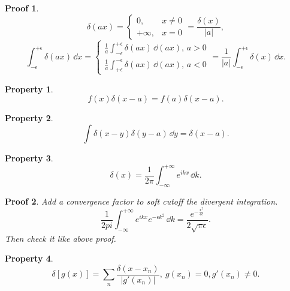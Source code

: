 \documentclass{article}
\theoremstyle{1}
\newtheorem{property}{Property}
\theoremstyle{2}
\newtheorem*{proof_env}{Proof}
\begin{document}
\begin{proof_env}
    \begin{equation}
        \delta(ax)=\left\{\begin{matrix}
           0,&x\not=0\\
            +\infty,&x=0 
        \end{matrix}\right. =\frac{\delta(x)}{\left|a\right|},
    \end{equation}
    \begin{equation}
       \int_{-\epsilon}^{+\epsilon}\delta(ax)\, \dd x=\left\{\begin{matrix}
        \frac{1}{a}\int_{-\epsilon}^{+\epsilon}\delta(ax)\, \dd (ax),\, a>0\\
        \frac{1}{a}\int_{+\epsilon}^{-\epsilon}\delta(ax)\, \dd (ax),\, a<0
       \end{matrix}\right. =\frac{1}{\left|a\right|}\int_{-\epsilon}^{+\epsilon}\delta(x)\, \dd x .
    \end{equation}
\end{proof_env}
\begin{property}
    \begin{equation}
        f(x)\delta(x-a)=f(a)\delta(x-a).
    \end{equation}
\end{property}
\begin{property}
    \begin{equation}
        \int\delta(x-y)\delta(y-a)\, \dd y=\delta(x-a).
    \end{equation}   
\end{property}
\begin{property}
    \begin{equation}
        \delta(x)=\frac{1}{2\pi}\int_{-\infty}^{+\infty}e^{ikx}\, \dd k.
    \end{equation}    
\end{property}
\begin{proof_env}
    Add a convergence factor to soft cutoff the divergent integration.
    \begin{equation}
       \frac{1}{2pi} \int_{-\infty}^{+\infty}e^{ikx}e^{-\epsilon k^2}\, \dd k=\frac{e^{-\frac{x^2}{4\epsilon}}}{2\sqrt{\pi\epsilon}}.
    \end{equation}
    Then check it like above proof.
\end{proof_env}
\begin{property}
    \begin{equation}
        \delta[g(x)]=\sum_{n}\frac{\delta(x-x_n)}{\left|g'(x_n)\right|},\ g(x_n)=0,g'(x_n)\not=0.
    \end{equation}
\end{property}
\end{document}
